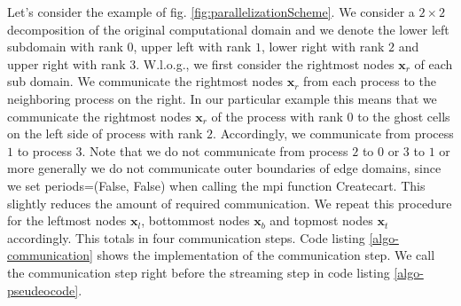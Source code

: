 \documentclass[a4paper,11pt, footsepline]{book}
\begin{document}
Let's consider the example of fig. \ref{fig:parallelizationScheme}. We consider a $2\times 2$ decomposition of the original computational domain and we denote the lower left subdomain with rank $0$, upper left with rank $1$, lower right with rank $2$ and upper right with rank $3$. W.l.o.g., we first consider the rightmost nodes $\mathbf{x}_r$ of each sub domain. We communicate the rightmost nodes $\mathbf{x}_r$ from each process to the neighboring process on the right. In our particular example this means that we communicate the rightmost nodes $\mathbf{x}_r$ of the process with rank $0$ to the ghost cells on the left side of process with rank $2$. Accordingly, we communicate from process $1$ to process $3$. Note that we do not communicate from process $2$ to $0$ or $3$ to $1$ or more generally we do not communicate outer boundaries of edge domains, since we set \textsf{periods=(False, False)} when calling the \ac{mpi} function \textsf{Create\textunderscore cart}. This slightly reduces the amount of required communication.
We repeat this procedure for the leftmost nodes $\mathbf{x}_l$, bottommost nodes $\mathbf{x}_b$ and topmost nodes $\mathbf{x}_t$ accordingly. This totals in four communication steps. Code listing \ref{algo-communication} shows the implementation of the communication step. We call the communication step right before the streaming step in code listing \ref{algo-pseudeocode}.
\end{document}
